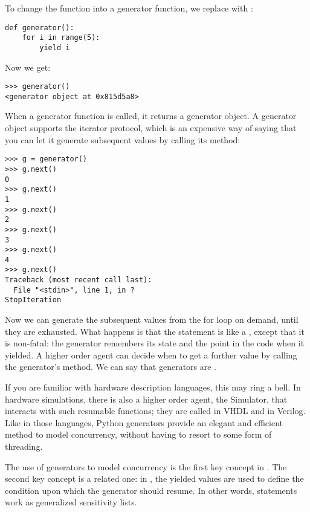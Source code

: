 To change the function into a generator function, we replace
 with :

\begin{verbatim}
def generator():
    for i in range(5):
        yield i

\end{verbatim}

Now we get:

\begin{verbatim}
>>> generator()
<generator object at 0x815d5a8>

\end{verbatim}

When a generator function is called, it returns a generator object. A
generator object supports the iterator protocol, which is an expensive
way of saying that you can let it generate subsequent values by
calling its  method:

\begin{verbatim}
>>> g = generator()
>>> g.next()
0
>>> g.next()
1
>>> g.next()
2
>>> g.next()
3
>>> g.next()
4
>>> g.next()
Traceback (most recent call last):
  File "<stdin>", line 1, in ?
StopIteration

\end{verbatim}

Now we can generate the subsequent values from the for loop on demand,
until they are exhausted. What happens is that the
 statement is like a
, except that it is non-fatal: the generator remembers
its state and the point in the code when it yielded. A higher order
agent can decide when to get a further value by calling the
generator's  method. We can say that generators are
.

If you are familiar with hardware description languages, this may ring
a bell. In hardware simulations, there is also a higher order agent,
the Simulator, that interacts with such resumable functions; they are
called  in VHDL and  in
Verilog. Like in those languages, Python generators provide an elegant
and efficient method to model concurrency, without having to resort to
some form of threading.

The use of generators to model concurrency is the first key concept in
\myhdl{}. The second key concept is a related one: in \myhdl{}, the
yielded values are used to define the condition upon which the
generator should resume. In other words, 
statements work as generalized sensitivity lists. 

